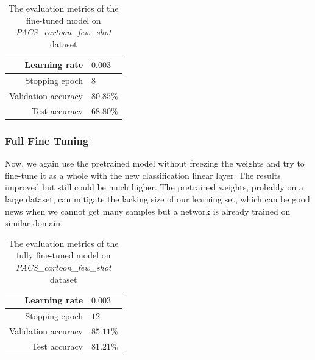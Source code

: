 \documentclass[a4paper,11pt]{article}
\begin{document}
\begin{table}[ht]
    \centering
    \begin{tabular}{ | r | l | }
        \hline
        Learning rate       & $0.003$   \\
        \hline
        Stopping epoch      & $8$       \\
        \hline
        Validation accuracy & $80.85\%$ \\
        \hline
        Test accuracy       & $68.80\%$ \\
        \hline
    \end{tabular}
    \caption{The evaluation metrics of the fine-tuned model on \textit{PACS\_cartoon\_few\_shot} dataset}
    \label{table:few_shot_fine_tuning_acc}
\end{table}

\subsubsection{Full Fine Tuning}
Now, we again use the pretrained model without freezing the weights and try to fine-tune it as a whole with the new classification linear layer.
The results improved but still could be much higher.
The pretrained weights, probably on a large dataset, can mitigate the lacking size of our learning set, which can be good news when we cannot get many samples but a network is already trained on similar domain.

\begin{table}[ht]
    \centering
    \begin{tabular}{ | r | l | }
        \hline
        Learning rate       & $0.003$   \\
        \hline
        Stopping epoch      & $12$      \\
        \hline
        Validation accuracy & $85.11\%$ \\
        \hline
        Test accuracy       & $81.21\%$ \\
        \hline
    \end{tabular}
    \caption{The evaluation metrics of the fully fine-tuned model on \textit{PACS\_cartoon\_few\_shot} dataset}
    \label{table:few_shot_full_fine_tuning_acc}
\end{table}
\end{document}
